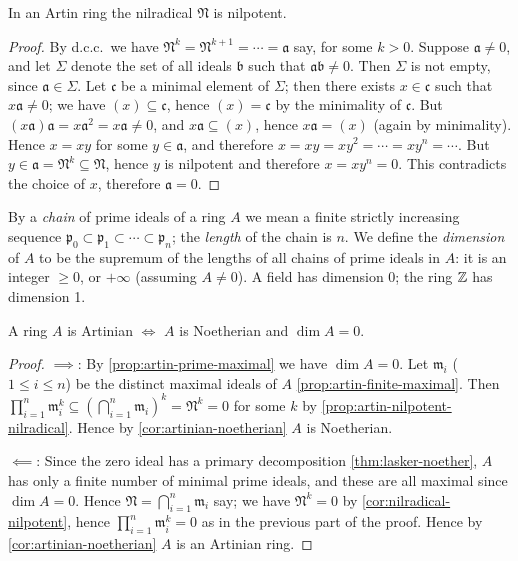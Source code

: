 \begin{proposition}\label{prop:artin-nilpotent-nilradical}
In an Artin ring the nilradical $\mathfrak{N}$ is nilpotent.
\end{proposition}

\begin{proof}
By d.c.c.\ we have $\mathfrak{N}^k = \mathfrak{N}^{k+1} = \cdots = \mathfrak{a}$ say, for some $k > 0$. Suppose $\mathfrak{a} \neq 0$, and let $\Sigma$ denote the set of all ideals $\mathfrak{b}$ such that $\mathfrak{a}\mathfrak{b} \neq 0$. Then $\Sigma$ is not empty, since $\mathfrak{a} \in \Sigma$. Let $\mathfrak{c}$ be a minimal element of $\Sigma$; then there exists $x \in \mathfrak{c}$ such that $x\mathfrak{a} \neq 0$; we have $(x) \subseteq \mathfrak{c}$, hence $(x) = \mathfrak{c}$ by the minimality of $\mathfrak{c}$. But $(x\mathfrak{a})\mathfrak{a} = x\mathfrak{a}^2 = x\mathfrak{a} \neq 0$, and $x\mathfrak{a} \subseteq (x)$, hence $x\mathfrak{a} = (x)$ (again by minimality). Hence $x = xy$ for some $y \in \mathfrak{a}$, and therefore $x = xy = xy^2 = \cdots = xy^n = \cdots$. But $y \in \mathfrak{a} = \mathfrak{N}^k \subseteq \mathfrak{N}$, hence $y$ is nilpotent and therefore $x = xy^n = 0$. This contradicts the choice of $x$, therefore $\mathfrak{a} = 0$.
\end{proof}

By a \emph{chain} of prime ideals of a ring $A$ we mean a finite strictly increasing sequence $\mathfrak{p}_0 \subset \mathfrak{p}_1 \subset \cdots \subset \mathfrak{p}_n$; the \emph{length} of the chain is $n$. We define the \emph{dimension} of $A$ to be the supremum of the lengths of all chains of prime ideals in $A$: it is an integer $\geq 0$, or $+\infty$ (assuming $A \neq 0$). A field has dimension 0; the ring $\mathbb{Z}$ has dimension 1.

\begin{theorem}\label{thm:artin-noetherian-dim0}
A ring $A$ is Artinian $\iff$ $A$ is Noetherian and $\dim A = 0$.
\end{theorem}

\begin{proof}
$\implies$: By \eqref{prop:artin-prime-maximal} we have $\dim A = 0$. Let $\mathfrak{m}_i$ ($1 \leq i \leq n$) be the distinct maximal ideals of $A$ \eqref{prop:artin-finite-maximal}. Then $\prod_{i=1}^n \mathfrak{m}_i^k \subseteq (\bigcap_{i=1}^n \mathfrak{m}_i)^k = \mathfrak{N}^k = 0$ for some $k$ by \eqref{prop:artin-nilpotent-nilradical}. Hence by \eqref{cor:artinian-noetherian} $A$ is Noetherian.

$\impliedby$: Since the zero ideal has a primary decomposition \eqref{thm:lasker-noether}, $A$ has only a finite number of minimal prime ideals, and these are all maximal since $\dim A = 0$. Hence $\mathfrak{N} = \bigcap_{i=1}^n \mathfrak{m}_i$ say; we have $\mathfrak{N}^k = 0$ by \eqref{cor:nilradical-nilpotent}, hence $\prod_{i=1}^n \mathfrak{m}_i^k = 0$ as in the previous part of the proof. Hence by \eqref{cor:artinian-noetherian} $A$ is an Artinian ring.
\end{proof}

